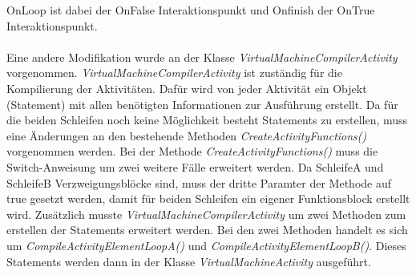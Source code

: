     OnLoop ist dabei der OnFalse Interaktionspunkt und Onfinish der OnTrue Interaktionspunkt.\\
    \\
    Eine andere Modifikation wurde an der Klasse \textit{VirtualMachineCompilerActivity} vorgenommen.
    \textit{VirtualMachineCompilerActivity} ist zuständig für die Kompilierung der Aktivitäten. 
    Dafür wird von jeder Aktivität ein Objekt (Statement) mit allen benötigten Informationen zur Ausführung erstellt.
    Da für die beiden Schleifen noch keine Möglichkeit besteht Statements zu erstellen, muss eine Änderungen an den bestehende Methoden \textit{CreateActivityFunctions()} vorgenommen werden.
    Bei der Methode \textit{CreateActivityFunctions()} muss die Switch-Anweisung um zwei weitere Fälle erweitert werden.
    Da SchleifeA und SchleifeB Verzweigungsblöcke sind, muss der dritte Paramter der Methode auf true gesetzt werden, damit für beiden Schleifen ein eigener Funktionsblock erstellt wird.
    Zusätzlich musste \textit{VirtualMachineCompilerActivity} um zwei Methoden zum erstellen der Statements erweitert werden.
    Bei den zwei Methoden handelt es sich um \textit{CompileActivityElementLoopA()} und \textit{CompileActivityElementLoopB()}.
    Dieses Statements werden dann in der Klasse \textit{VirtualMachineActivity} ausgeführt.

